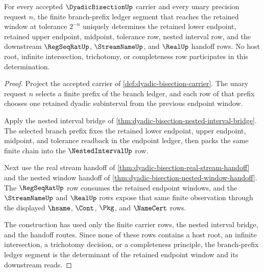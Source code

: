 \begin{theorem}
\label{thm:dyadic-bisection-branch-endpoint-determinacy}
For every accepted $\DyadicBisectionUp$ carrier and every unary precision
request $n$, the finite branch-prefix ledger segment that reaches the retained
window at tolerance $2^{-n}$ uniquely determines the retained lower endpoint,
retained upper endpoint, midpoint, tolerance row, nested interval row, and the
downstream $\RegSeqRatUp$, $\StreamNameUp$, and $\RealUp$ handoff rows. No host
root, infinite intersection, trichotomy, or completeness row participates in
this determination.
\end{theorem}
\begin{proof}
Project the accepted carrier of \autoref{def:dyadic-bisection-carrier}. The
unary request $n$ selects a finite prefix of the branch ledger, and each row of
that prefix chooses one retained dyadic subinterval from the previous endpoint
window.

Apply the nested interval bridge of
\autoref{thm:dyadic-bisection-nested-interval-bridge}. The selected branch
prefix fixes the retained lower endpoint, upper endpoint, midpoint, and
tolerance readback in the endpoint ledger, then packs the same finite chain
into the $\NestedIntervalUp$ row.

Next use the real stream handoff of
\autoref{thm:dyadic-bisection-real-stream-handoff} and the nested window
handoff of \autoref{thm:dyadic-bisection-nested-window-handoff}. The
$\RegSeqRatUp$ row consumes the retained endpoint windows, and the
$\StreamNameUp$ and $\RealUp$ rows expose that same finite observation through
the displayed $\hsame$, $\Cont$, $\Pkg$, and $\NameCert$ rows.

The construction has used only the finite carrier rows, the nested interval
bridge, and the handoff routes. Since none of these rows contains a host root,
an infinite intersection, a trichotomy decision, or a completeness principle,
the branch-prefix ledger segment is the determinant of the retained endpoint
window and its downstream reads.
\end{proof}

